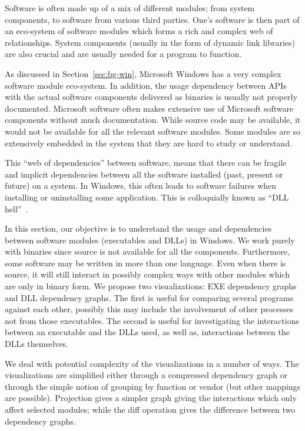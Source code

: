 
Software is often made up of
a mix of different modules; from system components, to
software from various third parties.
One's software is then part of an eco-system of software modules
which forms a rich and complex web of relationships.
System components (usually in the form of dynamic link libraries)
are also crucial and are usually needed for
a program to function.

As discussed in Section~\ref{sec:bg-win},
Microsoft Windows has a very complex software module eco-system.
In addition, the usage dependency between
APIs with the actual software components delivered as binaries
is usually not properly documented.
Microsoft software often makes extensive
use of Microsoft software components without much documentation.
While source code may be available, it would not be available for all
the relevant software modules.
Some modules are so extensively embedded in the system that they are
hard to study or understand.

This ``web of dependencies'' between software,
means that
there can be fragile and implicit dependencies between all the software
installed (past, present or future) on a system.
In Windows, this often leads to software failures when installing or
uninstalling some application.
This is colloquially known as ``DLL hell''~\cite{anderson2000end}.

In this section, our objective is to understand the usage and dependencies
between software modules (executables and DLLs) in Windows.
We work purely with binaries since source is not available for all the
components. Furthermore, some software may be written in more than
one language.
Even when there is source, it will still interact in possibly complex
ways with other modules which are only in binary form.
We propose two visualizations: EXE dependency graphs and DLL dependency
graphs. The first is useful for comparing several programs
against each other, possibly this may include the involvement
of other processes not from those executables.
The second is useful for investigating the interactions between
an executable and the DLLs used, as well as, interactions
between the DLLs themselves.

We deal with potential complexity of the visualizations in a number of ways.
The visualizations are
simplified either through a compressed dependency graph
or through the simple notion of grouping by function
or vendor (but other mappings are possible).
Projection gives a simpler graph giving the interactions which
only affect selected modules; while the diff operation
gives the difference between two dependency graphs.

